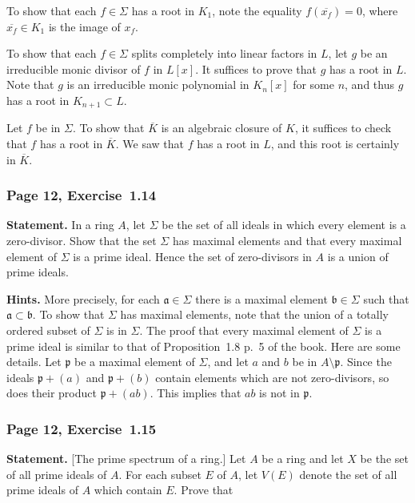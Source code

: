 \documentclass[12pt,letterpaper]{article}%
\newcommand{\mf}{\mathfrak}
\newcommand{\aaa}{\mf a}
\newcommand{\bbb}{\mf b}
\newcommand{\ppp}{\mf p}
\newcommand{\ov}{\overline}
\newcommand{\nn}{\noindent}
\begin{document}
To show that each $f\in\Sigma$ has a root in $K_1$, note the equality $f(\ov{x_f})=0$, where $\ov{x_f}\in K_1$ is the image of $x_f$. 

To show that each $f\in\Sigma$ splits completely into linear factors in $L$, let $g$ be an irreducible monic divisor of $f$ in $L[x]$. It suffices to prove that $g$ has a root in $L$. Note that $g$ is an irreducible monic polynomial in $K_n[x]$ for some $n$, and thus $g$ has a root in $K_{n+1}\subset L$.

Let $f$ be in $\Sigma$. To show that $\ov K$ is an algebraic closure of $K$, it suffices to check that $f$ has a root in $\ov K$. We saw that $f$ has a root in $L$, and this root is certainly in $\ov K$.

\subsubsection{Page 12, Exercise~1.14}\label{ex1.14}%

\textbf{Statement.} In a ring $A$, let $\Sigma$ be the set of all ideals in which every element is a zero-divisor. Show that the set $\Sigma$ has maximal elements and that every maximal element of $\Sigma$ is a prime ideal. Hence the set of zero-divisors in $A$ is a union of prime ideals.

\nn\textbf{Hints.} More precisely, for each $\aaa\in\Sigma$ there is a maximal element $\bbb\in\Sigma$ such that $\aaa\subset\bbb$. To show that $\Sigma$ has maximal elements, note that the union of a totally ordered subset of $\Sigma$ is in $\Sigma$. The proof that every maximal element of $\Sigma$ is a prime ideal is similar to that of Proposition~1.8 p.~5 of the book. Here are some details. Let $\ppp$ be a maximal element of $\Sigma$, and let $a$ and $b$ be in $A\setminus\ppp$. Since the ideals $\ppp+(a)$ and $\ppp+(b)$ contain elements which are not zero-divisors, so does their product $\ppp+(ab)$. This implies that $ab$ is not in $\ppp$.


\subsubsection{Page 12, Exercise~1.15}\label{ex1.15}%

\textbf{Statement.} [The prime spectrum of a ring.] Let $A$ be a ring and let $X$ be the set of all prime ideals of $A$. For each subset $E$ of $A$, let $V(E)$ denote the set of all prime ideals of $A$ which contain $E$. Prove that
\end{document}
